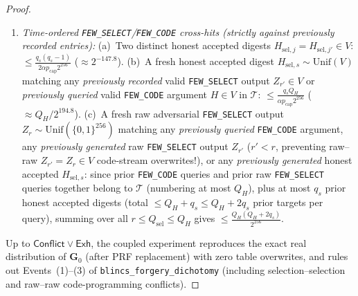 \documentclass[11pt,a4paper]{article}
\theoremstyle{definition}
\theoremstyle{remark}
\newcommand{\bits}{\{0,1\}}
\newcommand{\Unif}{\mathrm{Unif}}
\begin{document}
\begin{proof}
\begin{enumerate}[leftmargin=1.4em,itemsep=1pt]
    (a)~Two signing queries sample the same $256$-bit $\mathsf{draw}_i = \mathsf{draw}_j$: $\le q_s(q_s - 1) / 2^{257}$. Absent a draw collision, every signing query feeds a strictly new input into the random function $K_{\mathrm{salt}}$, producing a fresh independent $e_i \sim \Unif(\bits^{128})$. Since $(\mathsf{ctx}_i, M_i)$ is committed before $e_i$ is disclosed (\texttt{SPEC.md §7}), for every fixed prior \texttt{MESSAGE} query $(R', e', h', \mathsf{ctx}') \in \mathcal{T}$, $e_i$ matches $e'$ with probability $2^{-128}$, and conditional on $e_i = e'$ any non-replay $(\mathsf{ctx}_i, M_i)$ feeds a fresh input into $K_R$ (\texttt{rng\_\allowbreak failure\_\allowbreak hedged\_\allowbreak fallback}) so $R_i$ independently matches $R'$ with probability $2^{-128}$---total product $2^{-256}$ per pair, or $\le q_s Q_H / 2^{256}$ across all pairs.
    (b)~Distinct-input $256$-bit output collisions among $h_{\mathrm{msg}}$ or $D_{\mathrm{seed}}$ evaluations: $\le (Q_H + 2 q_s)^2 / 2^{257}$.
    (c)~Because each new honest $D_{\mathrm{seed}, s}$ is freshly sampled in $\bits^{256}$ absent (a)--(b), the probability it matches the $D$-component of any \emph{previously queried} \texttt{FEW\_SELECT} entry $(D_0, c)$ in $\mathcal{T}$ is $\le q_s Q_H / 2^{256}$.
  \item \emph{Time-ordered \texttt{FEW\_SELECT}/\texttt{FEW\_CODE} cross-hits (strictly against previously recorded entries):}
    (a)~Two distinct honest accepted digests $H_{\mathrm{sel}, j} = H_{\mathrm{sel}, j'} \in V$: $\le \frac{q_s(q_s - 1)}{2 \alpha p_{\mathrm{cap}} 2^{256}}$ ($\approx 2^{-147.8}$).
    (b)~A fresh honest accepted digest $H_{\mathrm{sel}, s} \sim \Unif(V)$ matching any \emph{previously recorded} valid \texttt{FEW\_SELECT} output $Z_{r'} \in V$ or \emph{previously queried} valid \texttt{FEW\_CODE} argument $H \in V$ in $\mathcal{T}$: $\le \frac{q_s Q_H}{\alpha p_{\mathrm{cap}} 2^{256}}$ ($\approx Q_H / 2^{194.8}$).
    (c)~A fresh raw adversarial \texttt{FEW\_SELECT} output $Z_r \sim \Unif(\bits^{256})$ matching any \emph{previously queried} \texttt{FEW\_CODE} argument, any \emph{previously generated} raw \texttt{FEW\_SELECT} output $Z_{r'}$ ($r' < r$, preventing raw--raw $Z_{r'} = Z_r \in V$ code-stream overwrites!), or any \emph{previously generated} honest accepted $H_{\mathrm{sel}, s}$: since prior \texttt{FEW\_CODE} queries and prior raw \texttt{FEW\_SELECT} queries together belong to $\mathcal{T}$ (numbering at most $Q_H$), plus at most $q_s$ prior honest accepted digests (total $\le Q_H + q_s \le Q_H + 2 q_s$ prior targets per query), summing over all $r \le Q_{\mathrm{sel}} \le Q_H$ gives $\le \frac{Q_H(Q_H + 2 q_s)}{2^{256}}$.
\end{enumerate}
Up to $\mathsf{Conflict} \vee \mathsf{Exh}$, the coupled experiment reproduces the exact real distribution of $\mathbf{G}_0$ (after PRF replacement) with zero table overwrites, and rules out Events~(1)--(3) of \texttt{blincs\_forgery\_dichotomy} (including selection--selection and raw--raw code-programming conflicts).


\end{proof}
\end{document}

